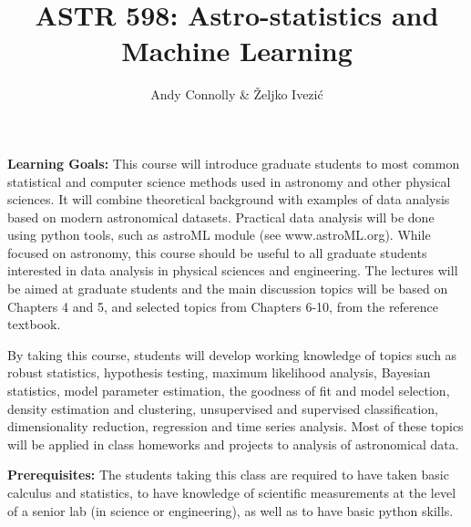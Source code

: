 \documentclass[10pt]{article}
\title{{\bf ASTR 598: Astro-statistics and Machine Learning}}
\author{Andy Connolly \& \v{Z}eljko Ivezi\'{c}}
\affil{University of Washington, Winter Quarter 2018}
\date{\vspace{-5ex}}
\begin{document}
\maketitle

\vskip 0.3in

\vskip 0.2in
\vskip 0.2in
\vskip 0.2in
\vskip 0.3in

{\bf Learning Goals:}
This course will introduce graduate students to most common statistical and computer science methods 
used in astronomy and other physical sciences. It will combine theoretical background with 
examples of data analysis based on modern astronomical datasets. Practical data analysis 
will be done using python tools, such as astroML module (see www.astroML.org). 
While focused on astronomy, this course should be useful to all graduate students interested in data 
analysis in physical sciences and engineering. The lectures will be aimed at graduate 
students and the main discussion topics will be based on Chapters 4 and 5, and selected 
topics from Chapters 6-10, from the reference textbook. 

By taking this course, students will develop working knowledge of topics such as robust 
statistics, hypothesis testing, maximum likelihood analysis, Bayesian statistics, model 
parameter estimation, the goodness of fit and model selection, density estimation and 
clustering, unsupervised and supervised classification, dimensionality reduction, 
regression and time series analysis. Most of these topics will be applied in class 
homeworks and projects to analysis of astronomical data. 

\vskip 0.2in
{\bf Prerequisites:}
The students taking this class are required to have taken basic calculus and statistics, 
to have knowledge of scientific measurements at the level of a senior lab (in science 
or engineering), as well as to have basic python skills. 
\end{document}
